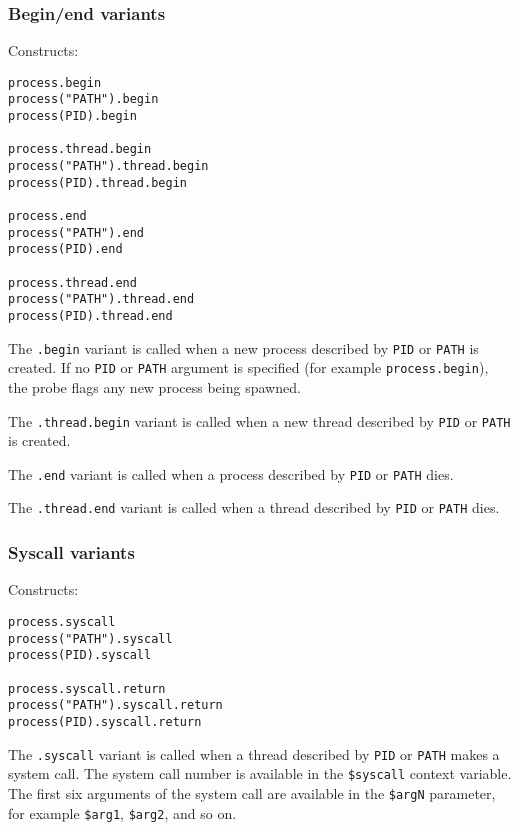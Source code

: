 \documentclass[twoside,english]{article}
\newenvironment{vindent}
{\begin{list}{}{\setlength{\listparindent}{6pt}}
\item[]}
{\end{list}}
\begin{document}
\subsubsection{Begin/end variants}
\label{sec:beginendvariants}
Constructs:
\begin{vindent}
\begin{verbatim}
process.begin
process("PATH").begin
process(PID).begin

process.thread.begin
process("PATH").thread.begin
process(PID).thread.begin

process.end
process("PATH").end
process(PID).end

process.thread.end
process("PATH").thread.end
process(PID).thread.end
\end{verbatim}
\end{vindent}

The \texttt{.begin} variant is called when a new process described by
\texttt{PID} or \texttt{PATH} is created. If no \texttt{PID} or
\texttt{PATH} argument is specified (for example
\texttt{process.begin}), the probe flags any new process being
spawned.

The \texttt{.thread.begin} variant is called when a new thread
described by \texttt{PID} or \texttt{PATH} is created.

The \texttt{.end} variant is called when a process described by
\texttt{PID} or \texttt{PATH} dies.

The \texttt{.thread.end} variant is called when a thread described by
\texttt{PID} or \texttt{PATH} dies.

\subsubsection{Syscall variants}
\label{sec:syscallvariants}
Constructs:
\begin{vindent}
\begin{verbatim}
process.syscall
process("PATH").syscall
process(PID).syscall

process.syscall.return
process("PATH").syscall.return
process(PID).syscall.return
\end{verbatim}
\end{vindent}

The \texttt{.syscall} variant is called when a thread described by
\texttt{PID} or \texttt{PATH} makes a system call.  The system call
number is available in the \texttt{\$syscall} context variable.  The
first six arguments of the system call are available in the
\texttt{\$argN} parameter, for example \texttt{\$arg1},
\texttt{\$arg2}, and so on.
\end{document}
